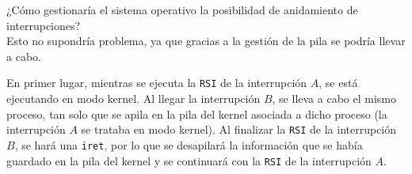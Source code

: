 \begin{ejercicio}
    ¿Cómo gestionaría el sistema operativo la posibilidad de anidamiento de interrupciones?\\

    Esto no supondría problema, ya que gracias a la gestión de la pila se podría llevar a cabo.

    En primer lugar, mientras se ejecuta la \verb|RSI| de la interrupción $A$, se está ejecutando en modo kernel. Al llegar la interrupción $B$, se lleva a cabo el mismo proceso, tan solo que se apila en la pila del kernel asociada a dicho proceso (la interrupción $A$ se trataba en modo kernel). Al finalizar la \verb|RSI| de la interrupción $B$, se hará una \verb|iret|, por lo que se desapilará la información que se había guardado en la pila del kernel y se continuará con la \verb|RSI| de la interrupción $A$.
\end{ejercicio}

